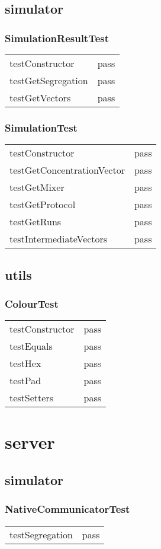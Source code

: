 \subsection{simulator}
\subsubsection*{SimulationResultTest}
\begin{tabular}{l|l}
testConstructor       & pass \\
testGetSegregation & pass \\
testGetVectors         & pass \\
\end{tabular}

\subsubsection*{SimulationTest}
\begin{tabular}{l|l}
testConstructor                    & pass \\
testGetConcentrationVector & pass \\
testGetMixer                         & pass \\
testGetProtocol                     & pass \\
testGetRuns                          & pass \\
testIntermediateVectors       & pass \\
\end{tabular}

\subsection{utils}
\subsubsection*{ColourTest}
\begin{tabular}{l|l}
testConstructor & pass \\
testEquals         & pass \\
testHex             & pass \\
testPad             & pass \\
testSetters        & pass \\
\end{tabular}

\section{server}
\subsection{simulator}
\subsubsection*{NativeCommunicatorTest}
\begin{tabular}{l|l}
testSegregation & pass \\
\end{tabular}